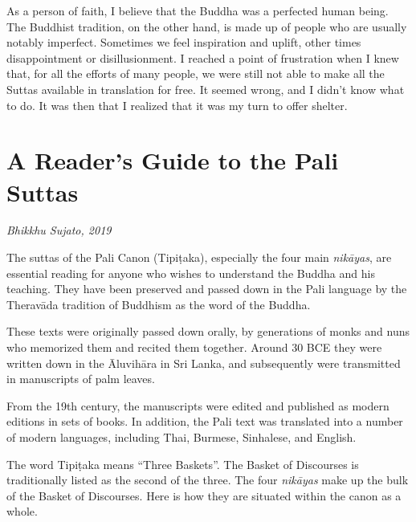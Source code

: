 \documentclass[12pt,openany]{book}%
\newcommand*{\scbyline}[1]{\begin{flushright}\textit{#1}\end{flushright}\bigskip}
\begin{document}
As a person of faith, I believe that the Buddha was a perfected human being. The Buddhist tradition, on the other hand, is made up of people who are usually notably imperfect. Sometimes we feel inspiration and uplift, other times disappointment or disillusionment. I reached a point of frustration when I knew that, for all the efforts of many people, we were still not able to make all the Suttas available in translation for free. It seemed wrong, and I didn’t know what to do. It was then that I realized that it was my turn to offer shelter.

%
\chapter*{A Reader’s Guide to the Pali Suttas}

\scbyline{Bhikkhu Sujato, 2019}

The suttas of the Pali Canon (\textsanskrit{Tipiṭaka}), especially the four main \textit{\textsanskrit{nikāyas}}, are essential reading for anyone who wishes to understand the Buddha and his teaching. They have been preserved and passed down in the Pali language by the \textsanskrit{Theravāda} tradition of Buddhism as the word of the Buddha.

These texts were originally passed down orally, by generations of monks and nuns who memorized them and recited them together. Around 30 BCE they were written down in the \textsanskrit{Āluvihāra} in Sri Lanka, and subsequently were transmitted in manuscripts of palm leaves.

From the 19th century, the manuscripts were edited and published as modern editions in sets of books. In addition, the Pali text was translated into a number of modern languages, including Thai, Burmese, Sinhalese, and English.

The word \textsanskrit{Tipiṭaka} means “Three Baskets”. The Basket of Discourses is traditionally listed as the second of the three. The four \textit{\textsanskrit{nikāyas}} make up the bulk of the Basket of Discourses. Here is how they are situated within the canon as a whole.
\end{document}
